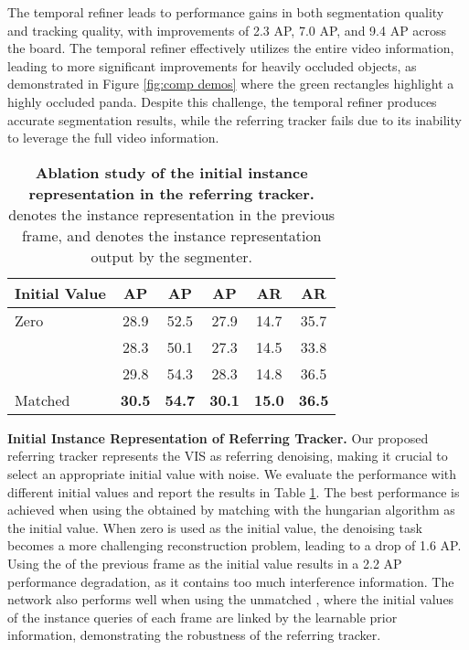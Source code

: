 \documentclass[10pt,twocolumn,letterpaper]{article}
\begin{document}
The temporal refiner leads to performance gains in both segmentation quality and tracking quality, with improvements of 2.3 AP, 7.0 AP, and 9.4 AP across the board. The temporal refiner effectively utilizes the entire video information, leading to more significant improvements for heavily occluded objects, as demonstrated in Figure \ref{fig:comp demos} where the green rectangles highlight a highly occluded panda. Despite this challenge, the temporal refiner produces accurate segmentation results, while the referring tracker fails due to its inability to leverage the full video information.
\begin{table}[t]
\centering
\begin{tabular}{l|ccccc}
	Initial Value & AP &  AP & AP & AR & AR  \\
	\hline
	Zero & 28.9 & 52.5 & 27.9 & 14.7 & 35.7 \\  & 28.3 & 50.1 & 27.3 & 14.5 & 33.8\\  &  29.8 & 54.3 & 28.3 & 14.8 & 36.5 \\ Matched  & \textbf{30.5} & \textbf{54.7} & \textbf{30.1} & \textbf{15.0} & \textbf{36.5}\\ \hline
 \end{tabular}
 \caption{\textbf{Ablation study of the initial instance representation in the referring tracker.}  denotes the instance representation in the previous frame, and  denotes the instance representation output by the segmenter.}\vspace{-3mm}
 \label{tab:noisy init}
\end{table}

\textbf{Initial Instance Representation of Referring Tracker.} Our proposed referring tracker represents the VIS as referring denoising, making it crucial to select an appropriate initial value with noise. We evaluate the performance with different initial values and report the results in Table \ref{tab:noisy init}. The best performance is achieved when using the  obtained by matching with the hungarian algorithm as the initial value. When zero is used as the initial value, the denoising task becomes a more challenging reconstruction problem, leading to a drop of 1.6 AP. Using the  of the previous frame as the initial value results in a 2.2 AP performance degradation, as it contains too much interference information. The network also performs well when using the unmatched , where the initial values of the instance queries of each frame are linked by the learnable prior information, demonstrating the robustness of the referring tracker.
\end{document}
